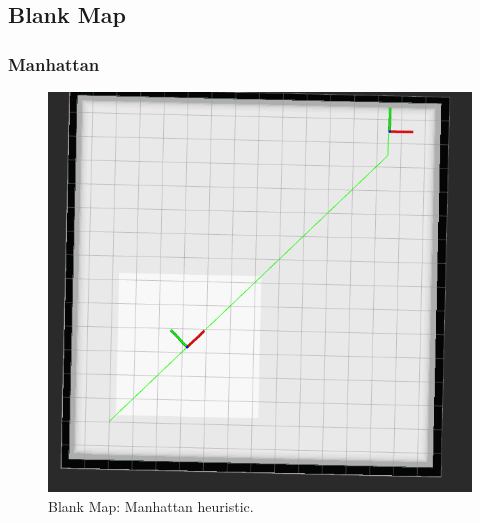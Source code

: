\documentclass{article}
\begin{document}
\clearpage

\subsection*{Blank Map}

\subsubsection*{Manhattan}
\begin{figure}[!ht]
    \centering
    \includegraphics[width=0.9\columnwidth]{../images/manhattan_blank.png}
    \caption{Blank Map: Manhattan heuristic.}
    \label{fig:manhattan_blank}
\end{figure}
\clearpage
\end{document}
